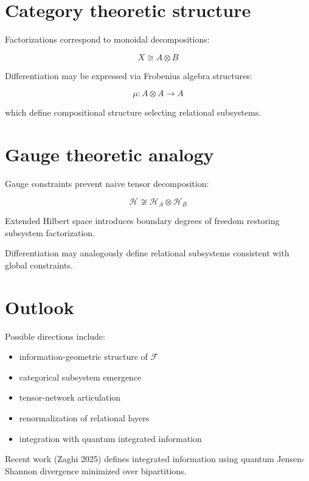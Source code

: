 \documentclass[11pt]{article}
\begin{document}
\section{Category theoretic structure}

Factorizations correspond to monoidal decompositions:

\begin{equation}
X \cong A \otimes B
\end{equation}

Differentiation may be expressed via Frobenius algebra structures:

\begin{equation}
\mu : A \otimes A \rightarrow A
\end{equation}

which define compositional structure selecting relational subsystems.

\section{Gauge theoretic analogy}

Gauge constraints prevent naive tensor decomposition:

\begin{equation}
\mathcal{H}
\not\cong
\mathcal{H}_A \otimes \mathcal{H}_B
\end{equation}

Extended Hilbert space introduces boundary degrees of freedom restoring subsystem factorization.

Differentiation may analogously define relational subsystems consistent with global constraints.

\section{Outlook}

Possible directions include:

\begin{itemize}
\item information-geometric structure of $\mathcal{F}$
\item categorical subsystem emergence
\item tensor-network articulation
\item renormalization of relational layers
\item integration with quantum integrated information
\end{itemize}

Recent work (Zaghi 2025) defines integrated information using quantum Jensen-Shannon divergence minimized over bipartitions.
\end{document}
